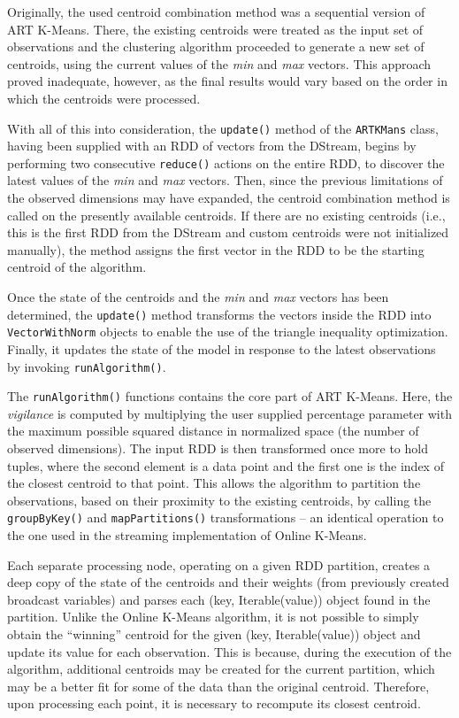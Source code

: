 \documentclass{l4proj}
\begin{document}
Originally, the used centroid combination method was a sequential version of ART K-Means. There, the existing centroids were treated as the input set of observations and the clustering algorithm proceeded to generate a new set of centroids, using the current values of the \textit{min} and \textit{max} vectors. This approach proved inadequate, however, as the final results would vary based on the order in which the centroids were processed.

With all of this into consideration, the \texttt{update()} method of the \texttt{ARTKMans} class, having been supplied with an RDD of vectors from the DStream, begins by performing two consecutive \texttt{reduce()} actions on the entire RDD, to discover the latest values of the \textit{min} and \textit{max} vectors. Then, since the previous limitations of the observed dimensions may have expanded, the centroid combination method is called on the presently available centroids. If there are no existing centroids (i.e., this is the first RDD from the DStream and custom centroids were not initialized manually), the method assigns the first vector in the RDD to be the starting centroid of the algorithm.

Once the state of the centroids and the \textit{min} and \textit{max} vectors has been determined, the \texttt{update()} method transforms the vectors inside the RDD into \texttt{VectorWithNorm} objects to enable the use of the triangle inequality optimization\cite{Triangle}. Finally, it updates the state of the model in response to the latest observations by invoking \texttt{runAlgorithm()}.

The \texttt{runAlgorithm()} functions contains the core part of ART K-Means. Here, the \textit{vigilance} is computed by multiplying the user supplied percentage parameter with the maximum possible squared distance in normalized space (the number of observed dimensions). The input RDD is then transformed once more to hold tuples, where the second element is a data point and the first one is the index of the closest centroid to that point. This allows the algorithm to partition the observations, based on their proximity to the existing centroids, by calling the \texttt{groupByKey()} and \texttt{mapPartitions()} transformations -- an identical operation to the one used in the streaming implementation of Online K-Means.

Each separate processing node, operating on a given RDD partition, creates a deep copy of the state of the centroids and their weights (from previously created broadcast variables) and parses each (key, Iterable(value)) object found in the partition. Unlike the Online K-Means algorithm, it is not possible to simply obtain the ``winning'' centroid for the given (key, Iterable(value)) object and update its value for each observation. This is because, during the execution of the algorithm, additional centroids may be created for the current partition, which may be a better fit for some of the data than the original centroid. Therefore, upon processing each point, it is necessary to recompute its closest centroid. 
\end{document}

